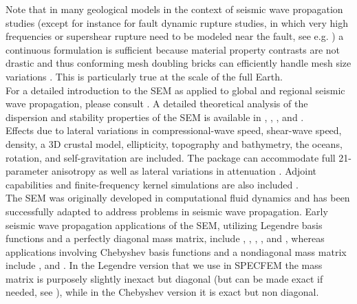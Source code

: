 Note that in many geological models in the context of seismic wave propagation studies
(except for instance for fault dynamic rupture studies, in which very high frequencies or supershear rupture need to be modeled near the fault, see e.g. \cite{BeGlCrViPi07,BeGlCrVi09,PuAmKa09,TaCrEtViBeSa10})
a continuous formulation is sufficient because material property contrasts are not drastic and thus
conforming mesh doubling bricks can efficiently handle mesh size variations \citep{KoTr02a,KoLiTrSuStSh04,LeChLiKoHuTr08,LeChKoHuTr09,LeKoHuTr09}.
This is particularly true at the scale of the full Earth.\\

For a detailed introduction to the SEM as applied to
global and regional seismic wave propagation, please consult \citet{TrKoLi08,PeKoLuMaLeCaLeMaLiBlNiBaTr11,KoVi98,KoTr99,Ch00,KoTr02a,KoTr02b,KoRiTr02,ChCaVi03,CaChViMo03,ChVa04,ChKoViCaVaFe07}.
A detailed theoretical analysis of the dispersion
and stability properties of the SEM is available in \citet{Coh02}, \citet{DeSe07}, \citet{SeOl07}, \citet{SeOl08} and \citet{MeStTh12}.\\

Effects due to lateral variations in compressional-wave
speed, shear-wave speed, density, a 3D crustal model, ellipticity,
topography and bathymetry, the oceans, rotation, and self-gravitation are included.
The package can accommodate full 21-parameter anisotropy \citep{ChTr07}
as well as lateral variations in attenuation \citep{SaKoTr10}. Adjoint
capabilities and finite-frequency kernel simulations are also included
\citep{TrKoLi08,PeKoLuMaLeCaLeMaLiBlNiBaTr11,LiTr06,LiTr08,FiIgBuKe09,ViOp09}.\\

The SEM was originally developed in computational fluid dynamics \citep{Pat84,MaPa89}
and has been successfully adapted to address problems in seismic wave propagation.
Early seismic wave propagation applications of the SEM, utilizing Legendre basis functions and a
perfectly diagonal mass matrix, include \cite{CoJoTo93}, \cite{Kom97},
\cite{FaMaPaQu97}, \cite{CaGa97}, \cite{KoVi98} and \cite{KoTr99},
whereas applications involving Chebyshev basis functions and a nondiagonal mass matrix
include \cite{SePr94}, \cite{PrCaSe94} and \cite{SePrPr95}.
In the Legendre version that we use in SPECFEM the mass matrix is purposely slightly inexact but diagonal (but can be made exact if needed, see \cite{Teu15}),
while in the Chebyshev version it is exact but non diagonal.\\

